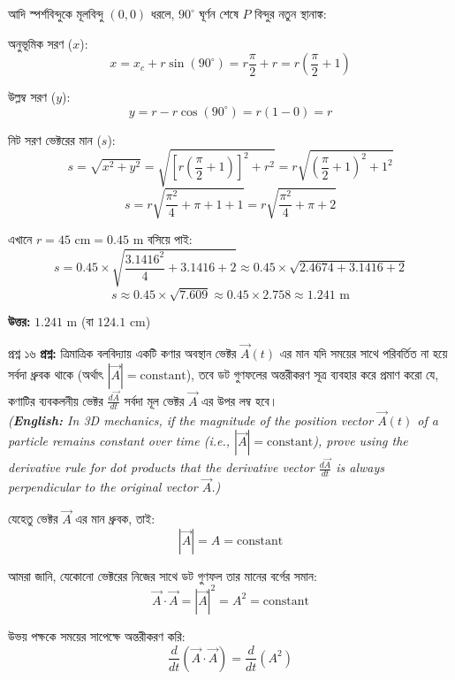 \documentclass[11pt,a4paper]{article}
\begin{document}
\begin{solbox}
\begin{solbox}
আদি স্পর্শবিন্দুকে মূলবিন্দু $(0,0)$ ধরলে, $90^\circ$ ঘূর্ণন শেষে $P$ বিন্দুর নতুন স্থানাঙ্ক:

অনুভূমিক সরণ ($x$):
$$x = x_c + r\sin(90^\circ) = r\frac{\pi}{2} + r = r\left(\frac{\pi}{2} + 1\right)$$

উল্লম্ব সরণ ($y$):
$$y = r - r\cos(90^\circ) = r(1 - 0) = r$$

নিট সরণ ভেক্টরের মান ($s$):
$$s = \sqrt{x^2 + y^2} = \sqrt{\left[r\left(\frac{\pi}{2} + 1\right)\right]^2 + r^2} = r\sqrt{\left(\frac{\pi}{2} + 1\right)^2 + 1^2}$$
$$s = r\sqrt{\frac{\pi^2}{4} + \pi + 1 + 1} = r\sqrt{\frac{\pi^2}{4} + \pi + 2}$$

এখানে $r = 45\text{ cm} = 0.45\text{ m}$ বসিয়ে পাই:
$$s = 0.45 \times \sqrt{\frac{3.1416^2}{4} + 3.1416 + 2} \approx 0.45 \times \sqrt{2.4674 + 3.1416 + 2}$$
$$s \approx 0.45 \times \sqrt{7.609} \approx 0.45 \times 2.758 \approx 1.241\text{ m}$$

\textbf{উত্তর:} $1.241\text{ m}$ (বা $124.1\text{ cm}$)
\end{solbox}

\vspace{0.4cm}

\begin{qbox}{প্রশ্ন ১৬}
\textbf{প্রশ্ন:} ত্রিমাত্রিক বলবিদ্যায় একটি কণার অবস্থান ভেক্টর $\vec{A}(t)$ এর মান যদি সময়ের সাথে পরিবর্তিত না হয়ে সর্বদা ধ্রুবক থাকে (অর্থাৎ $|\vec{A}| = \text{constant}$), তবে ডট গুণফলের অন্তরীকরণ সূত্র ব্যবহার করে প্রমাণ করো যে, কণাটির ব্যবকলনীয় ভেক্টর $\frac{d\vec{A}}{dt}$ সর্বদা মূল ভেক্টর $\vec{A}$ এর উপর লম্ব হবে। \\
\textit{(\textbf{English:} In 3D mechanics, if the magnitude of the position vector $\vec{A}(t)$ of a particle remains constant over time (i.e., $|\vec{A}| = \text{constant}$), prove using the derivative rule for dot products that the derivative vector $\frac{d\vec{A}}{dt}$ is always perpendicular to the original vector $\vec{A}$.)}
\end{qbox}

\begin{solbox}
যেহেতু ভেক্টর $\vec{A}$ এর মান ধ্রুবক, তাই:
$$|\vec{A}| = A = \text{constant}$$

আমরা জানি, যেকোনো ভেক্টরের নিজের সাথে ডট গুণফল তার মানের বর্গের সমান:
$$\vec{A} \cdot \vec{A} = |\vec{A}|^2 = A^2 = \text{constant}$$

উভয় পক্ষকে সময়ের সাপেক্ষে অন্তরীকরণ করি:
$$\frac{d}{dt}(\vec{A} \cdot \vec{A}) = \frac{d}{dt}(A^2)$$


\end{solbox}
\end{solbox}
\end{document}
